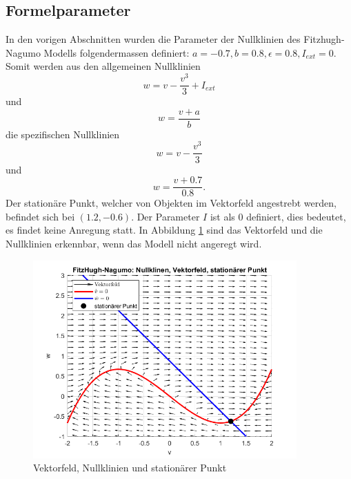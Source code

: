 \begin{refsection}
\subsection{Formelparameter}
In den vorigen Abschnitten wurden die Parameter der Nullklinien des Fitzhugh-Nagumo Modells folgendermassen definiert:
\(a = -0.7, b = 0.8, \epsilon = 0.8, I_{ext} = 0\). Somit werden aus den allgemeinen Nullklinien \[ w = v - \frac{v^3}{3} + I_{ext}\]
und \[w = \frac{v + a}{b}\] die spezifischen Nullklinien \[ w = v - \frac{v^3}{3}\]
und \[w = \frac{v + 0.7}{0.8}.\]
Der stationäre Punkt, welcher von Objekten im Vektorfeld angestrebt werden, befindet sich bei $(1.2 ,-0.6)$.
Der Parameter $I$ ist als 0 definiert, dies bedeutet, es findet keine Anregung statt.
In Abbildung \ref{fig:Parameter} sind das Vektorfeld und die Nullklinien erkennbar, wenn das Modell nicht angeregt wird.
\begin{figure}[h]
    \centering
    \includegraphics[width=0.9\textwidth]{papers/nerven/Bilder/Anregung1.png}
    \caption{Vektorfeld, Nullklinien und stationärer Punkt}
    \label{fig:Parameter}
\end{figure}

\end{refsection}
